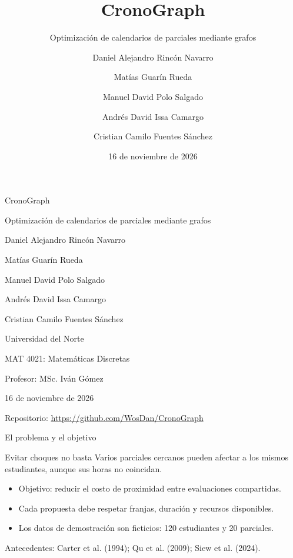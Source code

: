 \documentclass[aspectratio=169,11pt]{beamer}
\title{CronoGraph}
\subtitle{Optimización de calendarios de parciales mediante grafos}
\author{Daniel Alejandro Rincón Navarro \and Matías Guarín Rueda \and Manuel David Polo Salgado \and Andrés David Issa Camargo \and Cristian Camilo Fuentes Sánchez}
\institute{Universidad del Norte \\ MAT 4021: Matemáticas Discretas \\ Profesor: MSc. Iván Gómez}
\date{16 de noviembre de 2026}
\begin{document}
\begin{frame}[plain]
  \begin{minipage}{\textwidth}
    \centering
    \vspace*{0.6cm}
    {CronoGraph\par}
    \vspace{0.15cm}
    {\large Optimización de calendarios de parciales mediante grafos\par}
    \vspace{0.55cm}
    {\small\setlength{\baselineskip}{1.35\baselineskip}
    Daniel Alejandro Rincón Navarro\par
    Matías Guarín Rueda\par
    Manuel David Polo Salgado\par
    Andrés David Issa Camargo\par
    Cristian Camilo Fuentes Sánchez\par}
    \vspace{0.45cm}
    {\small\setlength{\baselineskip}{1.35\baselineskip}
    Universidad del Norte\par
    MAT 4021: Matemáticas Discretas\par
    Profesor: MSc. Iván Gómez\par
    16 de noviembre de 2026\par}
    \vspace{0.35cm}
    {\footnotesize Repositorio: \url{https://github.com/WosDan/CronoGraph}\par}
  \end{minipage}
\end{frame}


\begin{frame}{El problema y el objetivo}
  \begin{block}{Evitar choques no basta}
    Varios parciales cercanos pueden afectar a los mismos estudiantes, aunque sus horas no coincidan.
  \end{block}
  \begin{itemize}
    \item Objetivo: reducir el costo de proximidad entre evaluaciones compartidas.
    \item Cada propuesta debe respetar franjas, duración y recursos disponibles.
    \item Los datos de demostración son ficticios: 120 estudiantes y 20 parciales.
  \end{itemize}
  \vfill\footnotesize Antecedentes: Carter et al. (1994); Qu et al. (2009); Siew et al. (2024).
\end{frame}
\end{document}

